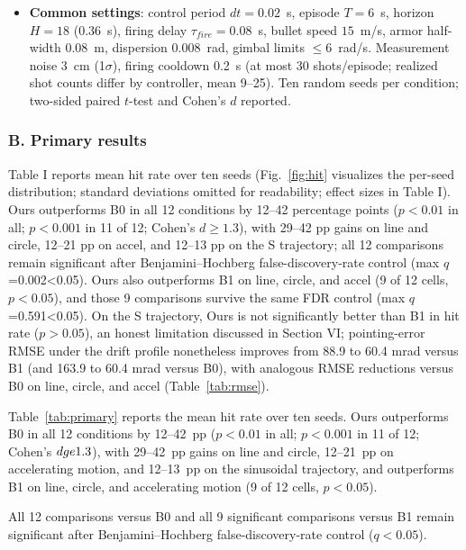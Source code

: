 \documentclass[journal]{IEEEtran}
\begin{document}
\begin{itemize}
\item \textbf{Common settings}: control period $dt=0.02$~s, episode $T=6$~s, horizon $H=18$ ($0.36$~s), firing delay $\tau_{fire}=0.08$~s, bullet speed $15$~m/s, armor half-width 0.08~m, dispersion 0.008~rad, gimbal limits $\le 6$~rad/s. Measurement noise 3~cm (1$\sigma$), firing cooldown 0.2~s (at most 30 shots/episode; realized shot counts differ by controller, mean 9--25). Ten random seeds per condition; two-sided paired $t$-test and Cohen's $d$ reported.
\end{itemize}

\subsubsection*{B. Primary results}

Table I reports mean hit rate over ten seeds (Fig.~\ref{fig:hit} visualizes the per-seed distribution; standard deviations omitted for readability; effect sizes in Table I). Ours outperforms B0 in all 12 conditions by 12--42 percentage points ($p<0.01$ in all; $p<0.001$ in 11 of 12; Cohen's $d\ge1.3$), with 29--42 pp gains on line and circle, 12--21 pp on accel, and 12--13 pp on the S trajectory; all 12 comparisons remain significant after Benjamini--Hochberg false-discovery-rate control (max $q$=0.002<0.05). Ours also outperforms B1 on line, circle, and accel (9 of 12 cells, $p<0.05$), and those 9 comparisons survive the same FDR control (max $q$=0.591<0.05). On the S trajectory, Ours is not significantly better than B1 in hit rate ($p>0.05$), an honest limitation discussed in Section VI; pointing-error RMSE under the drift profile nonetheless improves from 88.9 to 60.4 mrad versus B1 (and 163.9 to 60.4 mrad versus B0), with analogous RMSE reductions versus B0 on line, circle, and accel (Table~\ref{tab:rmse}).

Table~\ref{tab:primary} reports the mean hit rate over ten seeds. Ours outperforms B0 in all 12 conditions by 12--42~pp ($p<0.01$ in all; $p<0.001$ in 11 of 12; Cohen's $d\\ge1.3$), with 29--42~pp gains on line and circle, 12--21~pp on accelerating motion, and 12--13~pp on the sinusoidal trajectory, and outperforms B1 on line, circle, and accelerating motion (9 of 12 cells, $p<0.05$).

All 12 comparisons versus B0 and all 9 significant comparisons versus B1 remain significant after Benjamini--Hochberg false-discovery-rate control ($q<0.05$).
\end{document}
